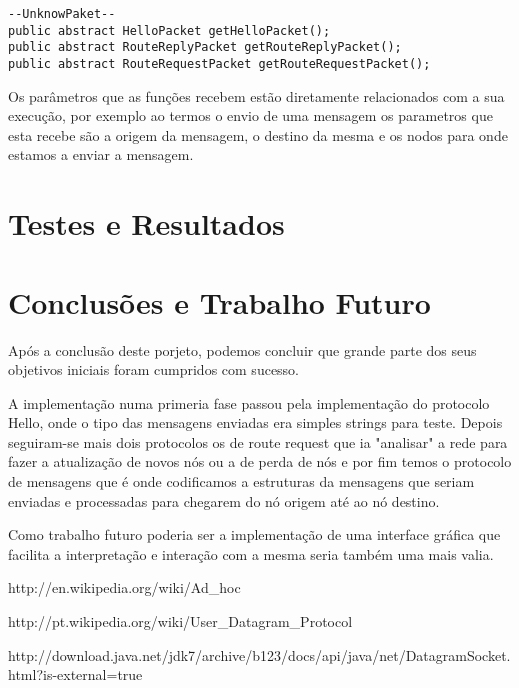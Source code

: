 \documentclass{llncs}
\begin{document}
\begin{verbatim}
--UnknowPaket--
public abstract HelloPacket getHelloPacket();
public abstract RouteReplyPacket getRouteReplyPacket();
public abstract RouteRequestPacket getRouteRequestPacket();

\end{verbatim}

Os parâmetros que as funções recebem estão diretamente relacionados com a sua execução, por exemplo ao termos o envio de uma mensagem os parametros que esta recebe são a origem da mensagem, o destino da mesma e os nodos para onde estamos a enviar a mensagem.
\section{Testes e Resultados}

\section{Conclusões e Trabalho Futuro}

Após a conclusão deste porjeto, podemos concluir que grande parte dos seus objetivos iniciais foram cumpridos com sucesso.

A implementação numa primeria fase passou pela implementação do protocolo Hello, onde o tipo das mensagens enviadas era simples strings para teste.
Depois seguiram-se mais dois protocolos os de route request que ia "analisar" a rede para fazer a atualização de novos nós ou a de perda de nós e por fim temos o protocolo de mensagens que é onde codificamos a estruturas da mensagens que seriam enviadas e processadas para chegarem do nó origem até ao nó destino.

Como trabalho futuro poderia ser a implementação de uma interface gráfica que facilita a interpretação e interação com a mesma seria também uma mais valia.




\begin{thebibliography}{1}
http://en.wikipedia.org/wiki/Ad\_hoc

http://pt.wikipedia.org/wiki/User\_Datagram\_Protocol

http://download.java.net/jdk7/archive/b123/docs/api/java/net/DatagramSocket.html?is-external=true


\end{thebibliography}
\end{document}
